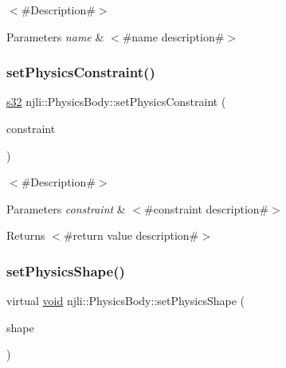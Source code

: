 $<$\#\+Description\#$>$


\begin{DoxyParams}{Parameters}
{\em name} & $<$\#name description\#$>$ \\
\hline
\end{DoxyParams}
\mbox{\label{classnjli_1_1_physics_body_a144a0d79efe85c3c64da84d28e880768}} 
\subsubsection{\texorpdfstring{set\+Physics\+Constraint()}{setPhysicsConstraint()}}
{\footnotesize\ttfamily \mbox{\hyperlink{_util_8h_aa62c75d314a0d1f37f79c4b73b2292e2}{s32}} njli\+::\+Physics\+Body\+::set\+Physics\+Constraint (\begin{DoxyParamCaption}\item[{\mbox{\hyperlink{classnjli_1_1_physics_constraint}{Physics\+Constraint}} $\ast$}]{constraint }\end{DoxyParamCaption})\hspace{0.3cm}{\ttfamily [protected]}}

$<$\#\+Description\#$>$


\begin{DoxyParams}{Parameters}
{\em constraint} & $<$\#constraint description\#$>$\\
\hline
\end{DoxyParams}
\begin{DoxyReturn}{Returns}
$<$\#return value description\#$>$ 
\end{DoxyReturn}
\mbox{\label{classnjli_1_1_physics_body_a5a4d5f7e9f4c39180f157f42be422358}} 
\subsubsection{\texorpdfstring{set\+Physics\+Shape()}{setPhysicsShape()}}
{\footnotesize\ttfamily virtual \mbox{\hyperlink{_thread_8h_af1e856da2e658414cb2456cb6f7ebc66}{void}} njli\+::\+Physics\+Body\+::set\+Physics\+Shape (\begin{DoxyParamCaption}\item[{\mbox{\hyperlink{classnjli_1_1_physics_shape}{Physics\+Shape}} $\ast$}]{shape }\end{DoxyParamCaption})\hspace{0.3cm}{\ttfamily [virtual]}}

